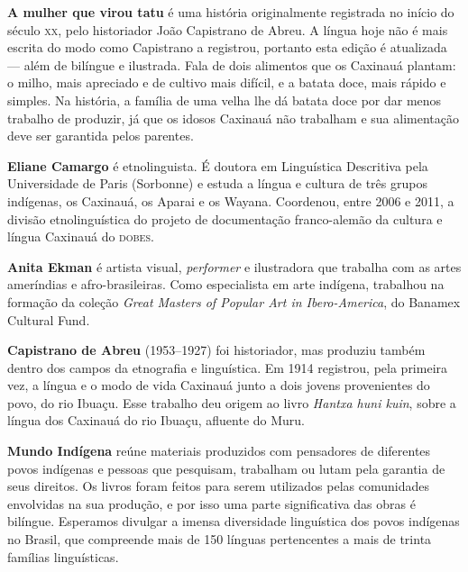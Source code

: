 \textbf{A mulher que virou tatu} é uma história originalmente registrada no início do século \textsc{xx}, pelo historiador João Capistrano de Abreu. A língua hoje não é mais escrita do modo como Capistrano a registrou, portanto esta edição é atualizada --- além de bilíngue e ilustrada. Fala de dois alimentos que os Caxinauá plantam: o milho, mais apreciado e de cultivo mais difícil, e a batata doce, mais rápido e simples. Na história, a família de uma velha lhe dá batata doce por dar menos trabalho de produzir, já que os idosos Caxinauá não trabalham e sua alimentação deve ser garantida pelos parentes.

\textbf{Eliane Camargo} é etnolinguista. É doutora em Linguística Descritiva pela Universidade de Paris (Sorbonne) e estuda a língua e cultura de três grupos indígenas, os Caxinauá, os Aparai e os Wayana. Coordenou, entre 2006 e 2011, a divisão etnolinguística do projeto de documentação franco-alemão da cultura e língua Caxinauá do \textsc{dobes}.

\textbf{Anita Ekman} é artista visual, \textit{performer} e ilustradora que trabalha com as artes ameríndias e afro-brasileiras. Como especialista em arte indígena, trabalhou na formação da coleção \textit{Great Masters of Popular Art in Ibero-America}, do Banamex Cultural Fund.

\textbf{Capistrano de Abreu} (1953--1927) foi historiador, mas produziu também dentro dos campos da etnografia e linguística. Em 1914 registrou, pela primeira vez, a língua e o modo de vida Caxinauá junto a dois jovens provenientes do povo, do rio Ibuaçu. Esse trabalho deu origem ao livro \textit{Hantxa huni kuin}, sobre a língua dos Caxinauá do rio Ibuaçu, afluente do Muru.

\pagebreak
\thispagestyle{empty}

\textbf{Mundo Indígena} reúne materiais produzidos com pensadores de diferentes povos indígenas e pessoas que pesquisam, trabalham ou lutam pela garantia de seus direitos. Os livros foram feitos para serem utilizados pelas comunidades envolvidas na sua produção, e por isso uma parte significativa das obras é bilíngue. Esperamos divulgar a imensa diversidade linguística dos povos indígenas no Brasil, que compreende mais de 150 línguas pertencentes a mais de trinta famílias linguísticas.



